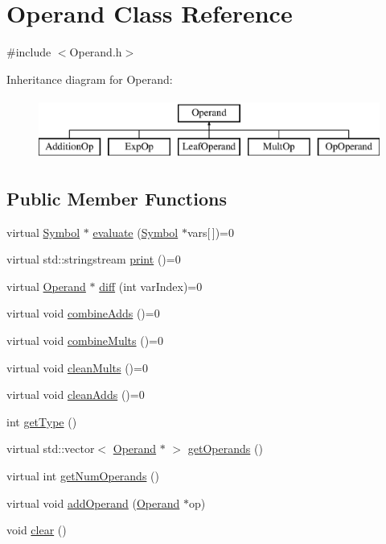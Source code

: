 \hypertarget{class_operand}{\section{Operand Class Reference}
\label{class_operand}
}


{\ttfamily \#include $<$Operand.\+h$>$}

Inheritance diagram for Operand\+:\begin{figure}[H]
\begin{center}
\leavevmode
\includegraphics[height=2.000000cm]{class_operand}
\end{center}
\end{figure}
\subsection*{Public Member Functions}
\begin{DoxyCompactItemize}
\item 
virtual \hyperlink{class_symbol}{Symbol} $\ast$ \hyperlink{class_operand_a910e63f6f002b26dd75deb83af9c69a7}{evaluate} (\hyperlink{class_symbol}{Symbol} $\ast$vars\mbox{[}$\,$\mbox{]})=0
\item 
virtual std\+::stringstream \hyperlink{class_operand_a8cc045602e1f603a5920249a69abde03}{print} ()=0
\item 
virtual \hyperlink{class_operand}{Operand} $\ast$ \hyperlink{class_operand_a057d6848e78c2cc4d36a5d57ef68fa61}{diff} (int var\+Index)=0
\item 
virtual void \hyperlink{class_operand_a1650a1adf9ed0d15423c746b6cdcdf2b}{combine\+Adds} ()=0
\item 
virtual void \hyperlink{class_operand_a82913d427a06d6d3f3832ce9ee0e59ff}{combine\+Mults} ()=0
\item 
virtual void \hyperlink{class_operand_aca12745fcb2d33fda67568181eb19179}{clean\+Mults} ()=0
\item 
virtual void \hyperlink{class_operand_adce551c3eaf269ed417647d9365fd8de}{clean\+Adds} ()=0
\item 
int \hyperlink{class_operand_a78a71c37d38e0b703e2f94caa4cfee56}{get\+Type} ()
\item 
virtual std\+::vector$<$ \hyperlink{class_operand}{Operand} $\ast$ $>$ \hyperlink{class_operand_ad51e24642aff7fbeaefebc732bf01565}{get\+Operands} ()
\item 
virtual int \hyperlink{class_operand_ab2648e8880b005d2500d97f583e19022}{get\+Num\+Operands} ()
\item 
virtual void \hyperlink{class_operand_aa4d004991f0b05b9b6aaa566443f63a6}{add\+Operand} (\hyperlink{class_operand}{Operand} $\ast$op)
\item 
void \hyperlink{class_operand_a3ace581e9ed6c16129d30d6862c342e9}{clear} ()
\end{DoxyCompactItemize}

